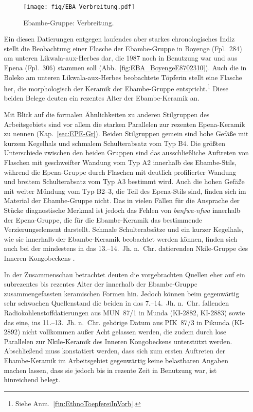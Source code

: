 \begin{figure}[p]
	\centering
	\texttt{[image: fig/EBA\_Verbreitung.pdf]}
	\caption{Ebambe-Gruppe: Verbreitung.}
	\label{fig:EBA_Verbreitung}
\end{figure}

Ein diesen Datierungen entgegen laufendes aber starkes chronologisches Indiz stellt die Beobachtung einer Flasche der Ebambe-Gruppe in Boyenge (Fpl.~284) am unteren \mbox{Likwala}-\mbox{aux}-\mbox{Herbes} dar, die 1987 noch in Benutzung war und aus Epena (Fpl.~306) stammen soll (Abb.~\ref{fig:EBA_BoyengeE8702310}). Auch die in Boleko am unteren \mbox{Likwala}-\mbox{aux}-\mbox{Herbes} beobachtete Töpferin stellt eine Flasche her, die morphologisch der Keramik der Ebambe-Gruppe entspricht.\footnote{Siehe Anm.~\ref{ftn:EthnoToepfereiInVorb}.} Diese beiden Belege deuten ein rezentes Alter der Ebambe-Keramik an.

Mit Blick auf die formalen Ähnlichkeiten zu anderen Stilgruppen des Arbeitsgebiets sind vor allem die starken Parallelen zur rezenten Epena-Keramik zu nennen (Kap.~\ref{sec:EPE-Gr}). Beiden Stilgruppen gemein sind hohe Gefäße mit kurzem Kegelhals und schmalem Schulterabsatz vom Typ B4. Die größten Unterschiede zwischen den beiden Gruppen sind das ausschließliche Auftreten von Flaschen mit geschweifter Wandung vom Typ A2 innerhalb des Ebambe-Stils, während die Epena-Gruppe durch Flaschen mit deutlich profilierter Wandung und breitem Schulterabsatz vom Typ A3 bestimmt wird. Auch die hohen Gefäße mit weiter Mündung vom Typ B2--3, die Teil des Epena-Stils sind, finden sich im Material der Ebambe-Gruppe nicht. Das in vielen Fällen für die Ansprache der Stücke diagnostische Merkmal ist jedoch das Fehlen von \textit{banfwa-nfwa} innerhalb der Epena-Gruppe, die für die Ebambe-Keramik das bestimmende Verzierungselement darstellt. Schmale Schulterabsätze und ein kurzer Kegelhals, wie sie innerhalb der Ebambe-Keramik beobachtet werden können, finden sich auch bei der mindestens in das 13.--14.~Jh. n.~Chr. datierenden Nkile-Gruppe des Inneren Kongobeckens \parencite[144--150]{Wotzka.1995}. 

In der Zusammenschau betrachtet deuten die vorgebrachten Quellen eher auf ein subrezentes bis rezentes Alter der innerhalb der Ebambe-Gruppe zusammengefassten keramischen Formen hin. Jedoch können beim gegenwärtig sehr schwachen Quellenstand die beiden in das 7.--14.~Jh. n.~Chr. fallenden Radiokohlenstoffdatierungen aus MUN~87/1 in Munda (KI-2882, KI-2883) sowie das eine, ins 11.--13.~Jh. n.~Chr. gehörige Datum aus PIK~87/3 in Pikunda (KI-2892) nicht vollkommen außer Acht gelassen werden, die zudem durch lose Parallelen zur Nkile-Keramik des Inneren Kongobeckens unterstützt werden. Abschließend muss konstatiert werden, dass sich zum ersten Auftreten der Ebambe-Keramik im Arbeitsgebiet gegenwärtig keine belastbaren Angaben machen lassen, dass sie jedoch bis in rezente Zeit in Benutzung war, ist hinreichend belegt.

